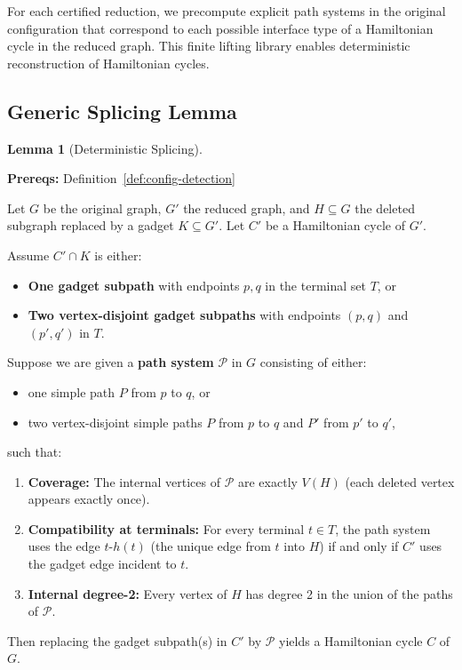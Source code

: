 \documentclass[12pt]{article}
\theoremstyle{definition}
\newtheorem{lemma}[theorem]{Lemma}
\newcommand{\prereq}[1]{\par\noindent\textbf{Prereqs:} #1\par}
\begin{document}
For each certified reduction, we precompute explicit path systems in the original configuration that correspond to each possible interface type of a Hamiltonian cycle in the reduced graph. This finite lifting library enables deterministic reconstruction of Hamiltonian cycles.

\subsection{Generic Splicing Lemma}
\label{subsec:splicing-lemma}

\begin{lemma}[Deterministic Splicing]
\label{lemma:splicing}
\label{lem:splicing}
\prereq{Definition~\ref{def:config-detection}}
Let $G$ be the original graph, $G'$ the reduced graph, and $H \subseteq G$ the deleted subgraph replaced by a gadget $K \subseteq G'$. Let $C'$ be a Hamiltonian cycle of $G'$.

Assume $C' \cap K$ is either:
\begin{itemize}
    \item \textbf{One gadget subpath} with endpoints $p,q$ in the terminal set $T$, or
    \item \textbf{Two vertex-disjoint gadget subpaths} with endpoints $(p,q)$ and $(p',q')$ in $T$.
\end{itemize}

Suppose we are given a \textbf{path system} $\mathcal{P}$ in $G$ consisting of either:
\begin{itemize}
    \item one simple path $P$ from $p$ to $q$, or
    \item two vertex-disjoint simple paths $P$ from $p$ to $q$ and $P'$ from $p'$ to $q'$,
\end{itemize}
such that:
\begin{enumerate}
    \item \textbf{Coverage:} The internal vertices of $\mathcal{P}$ are exactly $V(H)$ (each deleted vertex appears exactly once).
    \item \textbf{Compatibility at terminals:} For every terminal $t \in T$, the path system uses the edge $t$-$h(t)$ (the unique edge from $t$ into $H$) if and only if $C'$ uses the gadget edge incident to $t$.
    \item \textbf{Internal degree-2:} Every vertex of $H$ has degree 2 in the union of the paths of $\mathcal{P}$.
\end{enumerate}
Then replacing the gadget subpath(s) in $C'$ by $\mathcal{P}$ yields a Hamiltonian cycle $C$ of $G$.
\end{lemma}
\end{document}
